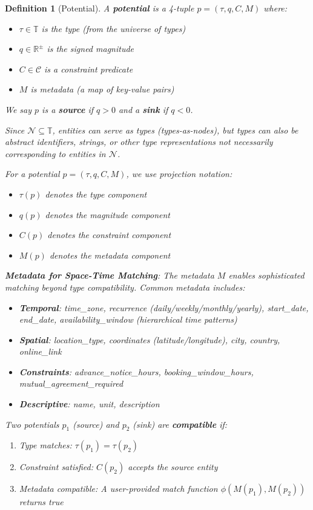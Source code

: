 \documentclass[11pt]{article}
\newtheorem{definition}{Definition}
\begin{document}
\begin{definition}[Potential]
A \textbf{potential} is a 4-tuple $p = (\tau, q, C, M)$ where:
\begin{itemize}
\item $\tau \in \mathbb{T}$ is the type (from the universe of types)
\item $q \in \mathbb{R}^\pm$ is the signed magnitude
\item $C \in \mathcal{C}$ is a constraint predicate
\item $M$ is metadata (a map of key-value pairs)
\end{itemize}
We say $p$ is a \textbf{source} if $q > 0$ and a \textbf{sink} if $q < 0$.

Since $\mathcal{N} \subseteq \mathbb{T}$, entities can serve as types (types-as-nodes), but types can also be abstract identifiers, strings, or other type representations not necessarily corresponding to entities in $\mathcal{N}$.

For a potential $p = (\tau, q, C, M)$, we use projection notation:
\begin{itemize}
\item $\tau(p)$ denotes the type component
\item $q(p)$ denotes the magnitude component
\item $C(p)$ denotes the constraint component
\item $M(p)$ denotes the metadata component
\end{itemize}

\textbf{Metadata for Space-Time Matching}: The metadata $M$ enables sophisticated matching beyond type compatibility. Common metadata includes:
\begin{itemize}
\item \textbf{Temporal}: time\_zone, recurrence (daily/weekly/monthly/yearly), start\_date, end\_date, availability\_window (hierarchical time patterns)
\item \textbf{Spatial}: location\_type, coordinates (latitude/longitude), city, country, online\_link
\item \textbf{Constraints}: advance\_notice\_hours, booking\_window\_hours, mutual\_agreement\_required
\item \textbf{Descriptive}: name, unit, description
\end{itemize}

Two potentials $p_1$ (source) and $p_2$ (sink) are \textbf{compatible} if:
\begin{enumerate}
\item Type matches: $\tau(p_1) = \tau(p_2)$
\item Constraint satisfied: $C(p_2)$ accepts the source entity
\item Metadata compatible: A user-provided match function $\phi(M(p_1), M(p_2))$ returns true
\end{enumerate}


\end{definition}
\end{document}
